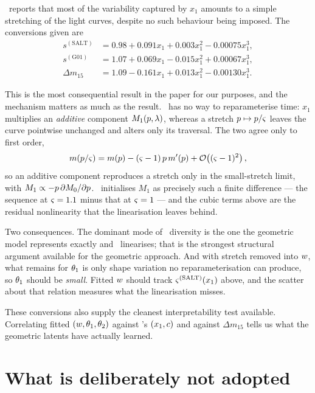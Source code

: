 \documentclass[11pt]{article}
\begin{document}
\salt\ reports that most of the variability captured by $x_{1}$ amounts to a
simple stretching of the light curves, despite no such behaviour being imposed.
The conversions given are
\begin{align}
  s^{(\mathrm{SALT})} &= 0.98 + 0.091x_{1} + 0.003x_{1}^{2} - 0.00075x_{1}^{3}, \\
  s^{(\mathrm{G01})}  &= 1.07 + 0.069x_{1} - 0.015x_{1}^{2} + 0.00067x_{1}^{3}, \\
  \Delta m_{15}       &= 1.09 - 0.161x_{1} + 0.013x_{1}^{2} - 0.00130x_{1}^{3}.
\end{align}

This is the most consequential result in the paper for our purposes, and the
mechanism matters as much as the result. \salt\ has no way to reparameterise
time: $x_{1}$ multiplies an \emph{additive} component $M_{1}(p,\lambda)$,
whereas a stretch $p \mapsto p/\varsigma$ leaves the curve pointwise
unchanged and alters only its traversal. The two agree only to first order,
\begin{equation}
  m\!\left(p/\varsigma\right)
    = m(p) - (\varsigma-1)\,p\,m'(p)
      + \mathcal{O}\!\left((\varsigma-1)^{2}\right),
\end{equation}
so an additive component reproduces a stretch only in the small-stretch limit,
with $M_{1} \propto -p\,\partial M_{0}/\partial p$. \salt\ initialises
$M_{1}$ as precisely such a finite difference --- the sequence at
$\varsigma = 1.1$ minus that at $\varsigma = 1$ --- and the cubic terms
above are the residual nonlinearity that the linearisation leaves behind.

Two consequences. The dominant mode of \snia\ diversity is the one the
geometric model represents exactly and \salt\ linearises; that is the strongest
structural argument available for the geometric approach. And with stretch
removed into $w$, what remains for $\theta_{1}$ is only shape variation no
reparameterisation can produce, so $\theta_{1}$ should be \emph{small}. Fitted
$w$ should track $\varsigma^{(\mathrm{SALT})}(x_{1})$ above, and the
scatter about that relation measures what the linearisation misses.

These conversions also supply the cleanest interpretability test available.
Correlating fitted $(w, \theta_{1}, \theta_{2})$ against \salt's
$(x_{1}, c)$ and against $\Delta m_{15}$ tells us what the geometric
latents have actually learned.

\section{What is deliberately not adopted}
\end{document}
